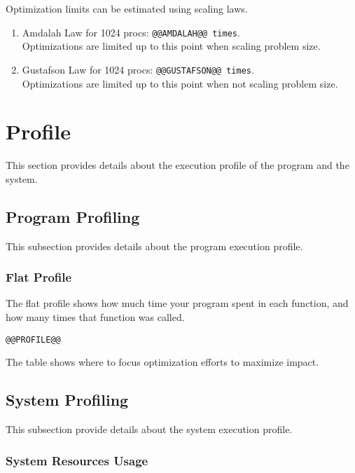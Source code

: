 \documentclass[a4paper]{article}
\begin{document}
Optimization limits can be estimated using scaling laws.

\begin{enumerate}
\item Amdalah Law for 1024 procs: {\tt @@AMDALAH@@ times}.\\ Optimizations are limited up to this point when scaling problem size. 
\item Gustafson Law for 1024 procs: {\tt @@GUSTAFSON@@ times}.\\ Optimizations are limited up to this point when not scaling problem size.
\end{enumerate}

\section{Profile}

This section provides details about the execution profile of the program and the system.

\subsection{Program Profiling}

This subsection provides details about the program execution profile.


\subsubsection{Flat Profile}

The flat profile shows how much time your program spent in each function, and how many times that function was called.

\begin{verbatim}
@@PROFILE@@
\end{verbatim}

The table shows where to focus optimization efforts to maximize impact.

\subsection{System Profiling}

This subsection provide details about the system execution profile.

\subsubsection{System Resources Usage}
\end{document}

